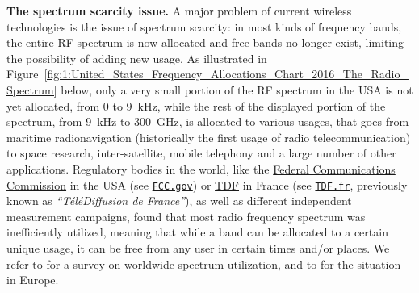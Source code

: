 

\textbf{The spectrum scarcity issue.}
%
A major problem of current wireless technologies is the issue of spectrum scarcity:
in most kinds of frequency bands, the entire RF spectrum is now allocated and free bands no longer exist, limiting the possibility of adding new usage.
As illustrated in Figure~\ref{fig:1:United_States_Frequency_Allocations_Chart_2016_The_Radio_Spectrum} below, only a very small portion of the RF spectrum in the USA is not yet allocated, from $0$ to \SI{9}{\kilo\hertz}, while the rest of the displayed portion of the spectrum, from \SI{9}{\kilo\hertz} to \SI{300}{\giga\hertz}, is allocated to various usages, that goes from maritime radionavigation (historically the first usage of radio telecommunication) to space research, inter-satellite, mobile telephony and a large number of other applications.
%
Regulatory bodies in the world, like the \href{https://www.fcc.gov/}{Federal Communications Commission} in the USA (see \href{https://www.fcc.gov/}{\texttt{FCC.gov}})
or \href{http://www.tdf.fr/}{TDF} in France (see \href{https://www.TDF.fr/}{\texttt{TDF.fr}}, previously known as \emph{``TéléDiffusion de France''}), as well as different independent measurement campaigns, found that most radio frequency spectrum was inefficiently utilized,
meaning that while a band can be allocated to a certain unique usage, it can be free from any user in certain times and/or places.
We refer to \cite{patil2011survey} for a survey on worldwide spectrum utilization, and to \cite{valenta2010survey} for the situation in Europe.

